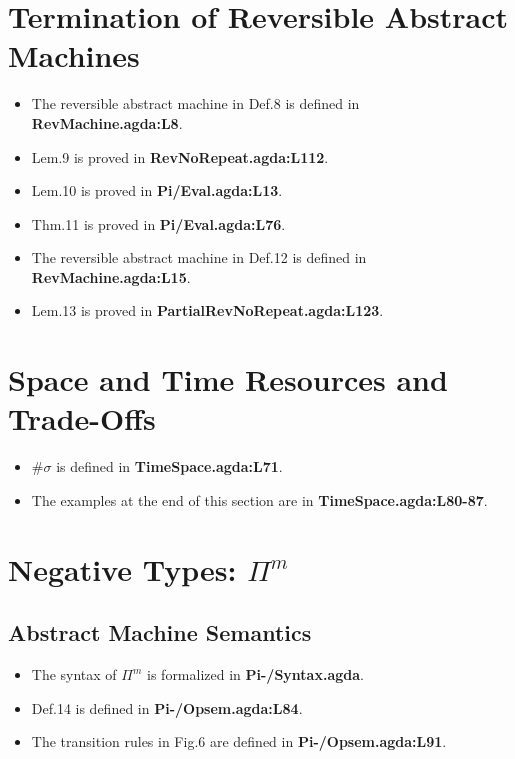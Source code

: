 \documentclass{article}
\begin{document}
\section{Termination of Reversible Abstract Machines}
\begin{itemize}
\item The reversible abstract machine in Def.8 is defined in \textbf{RevMachine.agda:L8}.
\item Lem.9 is proved in \textbf{RevNoRepeat.agda:L112}.
\item Lem.10 is proved in \textbf{Pi/Eval.agda:L13}.
\item Thm.11 is proved in \textbf{Pi/Eval.agda:L76}.
\item The reversible abstract machine in Def.12 is defined in \textbf{RevMachine.agda:L15}.
\item Lem.13 is proved in \textbf{PartialRevNoRepeat.agda:L123}.
\end{itemize}

\section{Space and Time Resources and Trade-Offs}
\begin{itemize}
\item $\# \sigma$ is defined in \textbf{TimeSpace.agda:L71}.
\item The examples at the end of this section are in \textbf{TimeSpace.agda:L80-87}.
\end{itemize}

\section{Negative Types: $\Pi^m$}
\subsection{Abstract Machine Semantics}
\begin{itemize}
\item The syntax of $\Pi^m$ is formalized in \textbf{Pi-/Syntax.agda}.
\item Def.14 is defined in \textbf{Pi-/Opsem.agda:L84}.
\item The transition rules in Fig.6 are defined in \textbf{Pi-/Opsem.agda:L91}.
\end{itemize}
\end{document}
